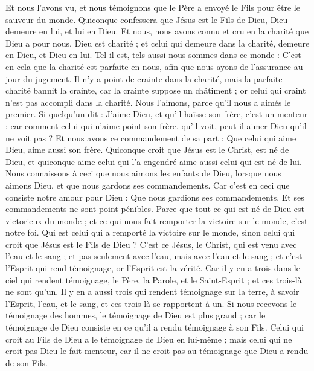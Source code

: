 \begin{multicols}{2}
Et nous l'avons vu, et nous témoignons que le Père a envoyé le Fils pour être le sauveur du monde.
Quiconque confessera que Jésus est le Fils de Dieu, Dieu demeure en lui, et lui en Dieu.
Et nous, nous avons connu et cru en la charité que Dieu a pour nous. Dieu est charité ; et celui qui demeure dans la charité, demeure en Dieu, et Dieu en lui.
Tel il est, tels aussi nous sommes dans ce monde : C'est en cela que la charité est parfaite en nous, afin que nous ayons de l'assurance au jour du jugement.
Il n'y a point de crainte dans la charité, mais la parfaite charité bannit la crainte, car la crainte suppose un châtiment ; or celui qui craint n'est pas accompli dans la charité.
Nous l'aimons, parce qu'il nous a aimés le premier.
Si quelqu'un dit : J'aime Dieu, et qu'il haïsse son frère, c'est un menteur ; car comment celui qui n'aime point son frère, qu'il voit, peut-il aimer Dieu qu'il ne voit pas ?
Et nous avons ce commandement de sa part : Que celui qui aime Dieu, aime aussi son frère.
\VerseOne{}Quiconque croit que Jésus est le Christ, est né de Dieu, et quiconque aime celui qui l'a engendré aime aussi celui qui est né de lui.
Nous connaissons à ceci que nous aimons les enfants de Dieu, lorsque nous aimons Dieu, et que nous gardons ses commandements.
Car c'est en ceci que consiste notre amour pour Dieu : Que nous gardions ses commandements. Et ses commandements ne sont point pénibles.
Parce que tout ce qui est né de Dieu est victorieux du monde ; et ce qui nous fait remporter la victoire sur le monde, c'est notre foi.
Qui est celui qui a remporté la victoire sur le monde, sinon celui qui croit que Jésus est le Fils de Dieu ?
C'est ce Jésus, le Christ, qui est venu avec l'eau et le sang ; et pas seulement avec l'eau, mais avec l'eau et le sang ; et c'est l'Esprit qui rend témoignage, or l'Esprit est la vérité.
Car il y en a trois dans le ciel qui rendent témoignage, le Père, la Parole, et le Saint-Esprit ; et ces trois-là ne sont qu'un.
Il y en a aussi trois qui rendent témoignage sur la terre, à savoir l'Esprit, l'eau, et le sang, et ces trois-là se rapportent à un.
Si nous recevons le témoignage des hommes, le témoignage de Dieu est plus grand ; car le témoignage de Dieu consiste en ce qu'il a rendu témoignage à son Fils.
Celui qui croit au Fils de Dieu a le témoignage de Dieu en lui-même ; mais celui qui ne croit pas Dieu le fait menteur, car il ne croit pas au témoignage que Dieu a rendu de son Fils.

\end{multicols}
